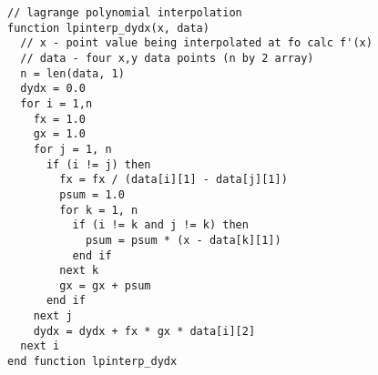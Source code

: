 \begin{lstlisting}[style=sPseudo,caption={}]
// lagrange polynomial interpolation
function lpinterp_dydx(x, data)
  // x - point value being interpolated at fo calc f'(x)
  // data - four x,y data points (n by 2 array)
  n = len(data, 1)
  dydx = 0.0
  for i = 1,n
    fx = 1.0
    gx = 1.0
    for j = 1, n
      if (i != j) then
        fx = fx / (data[i][1] - data[j][1])
        psum = 1.0
        for k = 1, n
          if (i != k and j != k) then
            psum = psum * (x - data[k][1])
          end if
        next k
        gx = gx + psum
      end if
    next j
    dydx = dydx + fx * gx * data[i][2]
  next i
end function lpinterp_dydx
\end{lstlisting}

